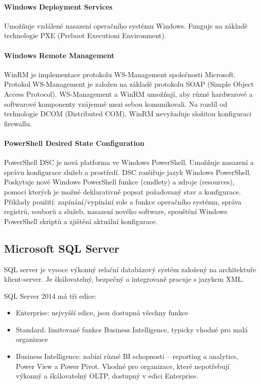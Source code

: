 \paragraph{Windows Deployment Services} 
Umožňuje vzdálené nasazení operačního systému Windows. Funguje na základě technologie PXE (Preboot Executioni Environment). \cite{MasteringWindowsServer}

\paragraph{Windows Remote Management}
WinRM je implementace protokolu WS-Management společnosti Microsoft. Protokol WS-Management je založen na základě protokolu SOAP (Simple Object Access Protocol). WS-Management a WinRM umožňují, aby různé hardwarové a softwarové komponenty vzájemně mezi sebou komunikovali. Na rozdíl od technologie DCOM (Distributed COM), WinRM nevyžaduje složitou konfiguraci firewallu. \cite{MasteringWindowsServer}

\paragraph{PowerShell Desired State Configuration}
PowerShell DSC je nová platforma ve Windows PowerShell. Umožňuje nasazení a správu konfigurace služeb a prostředí. DSC rozšiřuje jazyk Windows PowerShell. Poskytuje nové Windows PowerShell funkce (cmdlety) a zdroje (resources), pomocí kterých je možné deklarativně popsat požadovaný stav a konfigurace. Příklady použití: zapínání/vypínání role a funkce operačního systému, správa registrů, souborů a služeb, nasazení nového software, spouštění Windows PowerShell skriptů a zjištění aktuální konfigurace. \cite{dsc}

\subsection{Microsoft SQL Server}
SQL server je vysoce výkonný relační databázový systém založený na architektuře klient-server. Je škálovatelný, bezpečný a integrovaně pracuje s jazykem XML. 

SQL Server 2014 má tři edice:
\begin{itemize}
\item Enterprise: nejvyšší edice, jsou dostupná všechny funkce
\item Standard: limitované funkce Business Intelligence, typicky vhodné pro malá organizace
\item Business Intelligence: nabízí různé BI schopnosti -- reporting a analytics, Power View a Power Pivot. Vhodné pro organizace, které nepotřebují výkonný a škálovatelný OLTP, dostupný v edici Enterprise.
\end{itemize}

